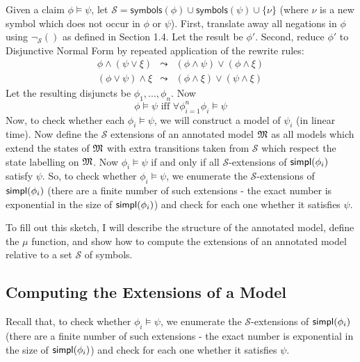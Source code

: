 Given a claim $\phi \models \psi$, let $\mathcal{S} = \mathsf{symbols}(\phi) \cup \mathsf{symbols}(\psi) \cup \{\nu\}$ (where $\nu$ is a new symbol which does not occur in $\phi$ or $\psi$).
First, translate away all negations in $\phi$ using $\neg_\mathcal{S}()$ as defined in Section 1.4.
Let the result be $\phi'$.
Second, reduce $\phi'$ to Disjunctive Normal Form by repeated application of the rewrite rules:
\begin{eqnarray*}
\phi \land (\psi \lor \xi) & \leadsto & (\phi \land \psi) \lor (\phi \land \xi)  \\
(\phi \lor \psi) \land \xi & \leadsto & (\phi \land \xi) \lor (\psi \land \xi) 
\end{eqnarray*}
Let the resulting disjuncts be $\phi_1, ..., \phi_n$. 
Now 
\[
\phi \models \psi \mbox{ iff } \forall \phi_{i=1}^n \phi_i \models \psi
\]
Now, to check whether each $\phi_i \models \psi$, we will construct a model of $\psi_i$ (in linear time). 
Now define the $\mathcal{S}$ extensions of an annotated model $\frak{M}$ as all models which extend the states of $\frak{M}$ with extra transitions taken from $\mathcal{S}$ which respect the state labelling on $\frak{M}$.
Now $\phi_i \models \psi$ if and only if all $\mathcal{S}$-extensions of $\mathsf{simpl}(\phi_i)$ satisfy $\psi$.
So, to check whether $\phi_i \models \psi$, we enumerate the $\mathcal{S}$-extensions of $\mathsf{simpl}(\phi_i)$ (there are a finite number of such extensions - the exact number is exponential in the size of $\mathsf{simpl}(\phi_i)$) and check for each one whether it satisfies $\psi$.

To fill out this sketch, I will describe the structure of the annotated model, define the $\mu$ function, and show how to compute the extensions of an annotated model relative to a set $\mathcal{S}$ of symbols.


\subsection{Computing the Extensions of a Model}

Recall that, to check whether $\phi_i \models \psi$, we enumerate the $\mathcal{S}$-extensions of $\mathsf{simpl}(\phi_i)$ (there are a finite number of such extensions - the exact number is exponential in the size of $\mathsf{simpl}(\phi_i)$) and check for each one whether it satisfies $\psi$.

